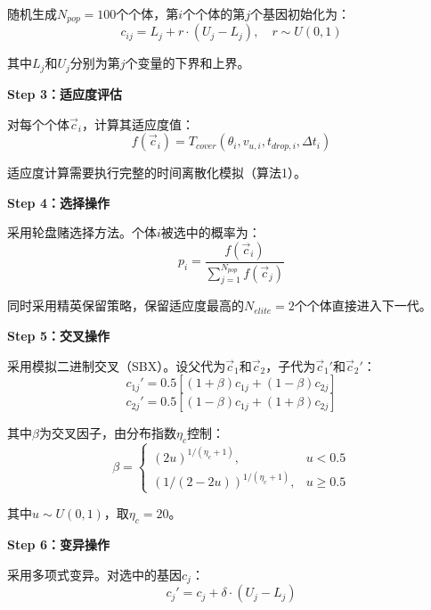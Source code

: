 \documentclass[12pt,a4paper]{article}
\begin{document}
\indent 随机生成$N_{pop} = 100$个个体，第$i$个个体的第$j$个基因初始化为：
\begin{equation}
c_{ij} = L_j + r \cdot (U_j - L_j), \quad r \sim U(0, 1)
\end{equation}

\indent 其中$L_j$和$U_j$分别为第$j$个变量的下界和上界。

\indent \textbf{Step 3：适应度评估}

\indent 对每个个体$\vec{c}_i$，计算其适应度值：
\begin{equation}
f(\vec{c}_i) = T_{cover}(\theta_i, v_{u,i}, t_{drop,i}, \Delta t_i)
\end{equation}

\indent 适应度计算需要执行完整的时间离散化模拟（算法1）。

\indent \textbf{Step 4：选择操作}

\indent 采用轮盘赌选择方法。个体$i$被选中的概率为：
\begin{equation}
p_i = \frac{f(\vec{c}_i)}{\sum_{j=1}^{N_{pop}} f(\vec{c}_j)}
\end{equation}

\indent 同时采用精英保留策略，保留适应度最高的$N_{elite} = 2$个个体直接进入下一代。

\indent \textbf{Step 5：交叉操作}

\indent 采用模拟二进制交叉（SBX）。设父代为$\vec{c}_1$和$\vec{c}_2$，子代为$\vec{c}_1'$和$\vec{c}_2'$：
\begin{equation}
c_{1j}' = 0.5[(1+\beta)c_{1j} + (1-\beta)c_{2j}]
\end{equation}
\begin{equation}
c_{2j}' = 0.5[(1-\beta)c_{1j} + (1+\beta)c_{2j}]
\end{equation}

\indent 其中$\beta$为交叉因子，由分布指数$\eta_c$控制：
\begin{equation}
\beta = 
\begin{cases}
(2u)^{1/(\eta_c+1)}, & u < 0.5 \\
(1/(2-2u))^{1/(\eta_c+1)}, & u \geq 0.5
\end{cases}
\end{equation}

\indent 其中$u \sim U(0, 1)$，取$\eta_c = 20$。

\indent \textbf{Step 6：变异操作}

\indent 采用多项式变异。对选中的基因$c_j$：
\begin{equation}
c_j' = c_j + \delta \cdot (U_j - L_j)
\end{equation}
\end{document}
